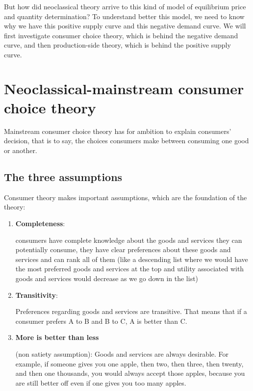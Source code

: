 \documentclass[
  letterpaper,
  DIV=11,
  numbers=noendperiod]{scrreprt}
\begin{document}
But how did neoclassical theory arrive to this kind of model of
equilibrium price and quantity determination? To understand better this
model, we need to know why we have this positive supply curve and this
negative demand curve. We will first investigate consumer choice theory,
which is behind the negative demand curve, and then production-side
theory, which is behind the positive supply curve.

\hypertarget{neoclassical-mainstream-consumer-choice-theory}{%
\chapter{Neoclassical-mainstream consumer choice
theory}\label{neoclassical-mainstream-consumer-choice-theory}}

Mainstream consumer choice theory has for ambition to explain consumers'
decision, that is to say, the choices consumers make between consuming
one good or another.

\hypertarget{the-three-assumptions}{%
\section{The three assumptions}\label{the-three-assumptions}}

Consumer theory makes important assumptions, which are the foundation of
the theory:

\begin{enumerate}
\def\labelenumi{\arabic{enumi}.}
\item
  \textbf{Completeness}:

  consumers have complete knowledge about the goods and services they
  can potentially consume, they have clear preferences about these goods
  and services and can rank all of them (like a descending list where we
  would have the most preferred goods and services at the top and
  utility associated with goods and services would decrease as we go
  down in the list)
\item
  \textbf{Transitivity}:

  Preferences regarding goods and services are transitive. That means
  that if a consumer prefers A to B and B to C, A is better than C.
\item
  \textbf{More is better than less}

  (non satiety assumption): Goods and services are always desirable. For
  example, if someone gives you one apple, then two, then three, then
  twenty, and then one thousands, you would always accept those apples,
  because you are still better off even if one gives you too many
  apples.
\end{enumerate}
\end{document}
